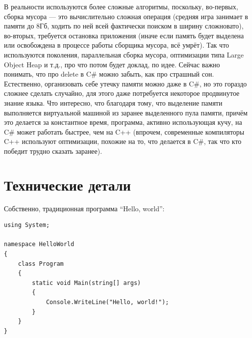 \documentclass[a5paper]{article}
\begin{document}
В реальности используются более сложные алгоритмы, поскольку, во-первых, сборка мусора --- это вычислительно сложная операция (средняя игра занимает в памяти до 8Гб, ходить по ней всей фактически поиском в ширину сложновато), во-вторых, требуется остановка приложения (иначе если память будет выделена или освобождена в процессе работы сборщика мусора, всё умрёт). Так что используются поколения, параллельная сборка мусора, оптимизации типа Large Object Heap и т.д., про что потом будет доклад, по идее. Сейчас важно понимать, что про delete в C\# можно забыть, как про страшный сон. Естественно, организовать себе утечку памяти можно даже в C\#, но это гораздо сложнее сделать случайно, для этого даже потребуется некоторое продвинутое знание языка. Что интересно, что благодаря тому, что выделение памяти выполняется виртуальной машиной из заранее выделенного пула памяти, причём это делается за константное время, программа, активно использующая кучу, на C\# может работать быстрее, чем на C++ (впрочем, современные компиляторы C++ используют оптимизации, похожие на то, что делается в C\#, так что кто победит трудно сказать заранее).

\section{Технические детали}

Собственно, традиционная программа ``Hello, world'':

\begin{verbatim}
using System;

namespace HelloWorld
{
    class Program
    {
        static void Main(string[] args)
        {
            Console.WriteLine("Hello, world!");
        }
    }
}
\end{verbatim}
\end{document}
